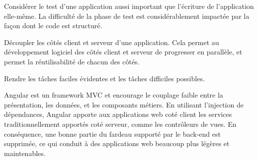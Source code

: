     Considérer le test d'une application aussi important que l'écriture de l'application elle-même. La difficulté de la phase de test est considérablement impactée par la façon dont le code est structuré.

    Découpler les côtés client et serveur d'une application. Cela permet au développement logiciel des côtés client et serveur de progresser en parallèle, et permet la réutilisabilité de chacun des côtés.

    Rendre les tâches faciles évidentes et les tâches difficiles possibles.


Angular est un framework MVC et encourage le couplage faible entre la présentation, les données, et les composants métiers. En utilisant l’injection de dépendances, Angular apporte aux applications web coté client les services traditionnellement apportés coté serveur, comme les contrôleurs de vues. En conséquence, une bonne partie du fardeau supporté par le back-end est supprimée, ce qui conduit à des applications web beaucoup plus légères et maintenables.
